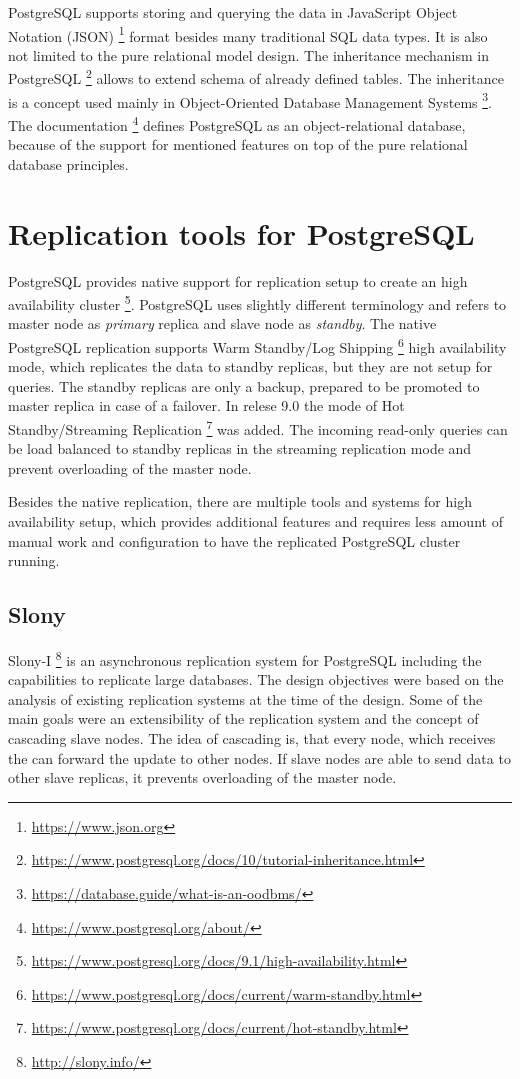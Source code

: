 \documentclass[
  digital, %
  twoside, %
  table,   %
  lof,     %
  lot,     %
]{fithesis3}
\begin{document}
PostgreSQL supports storing and querying the data in JavaScript Object Notation (JSON) \footnote{\url{https://www.json.org}} format besides many traditional SQL data types. It is also not limited to the pure relational model design. The inheritance mechanism in PostgreSQL \footnote{\url{https://www.postgresql.org/docs/10/tutorial-inheritance.html}} allows to extend schema of already defined tables. The inheritance is a concept used mainly in Object-Oriented Database Management Systems \footnote{\url{https://database.guide/what-is-an-oodbms/}}. The documentation \footnote{\url{https://www.postgresql.org/about/}} defines PostgreSQL as an object-relational database, because of the support for mentioned features on top of the pure relational database principles.

\section{Replication tools for PostgreSQL}
PostgreSQL provides native support for replication setup to create an high availability cluster \footnote{\url{https://www.postgresql.org/docs/9.1/high-availability.html}}. PostgreSQL uses slightly different terminology and refers to master node as \textit{primary} replica and slave node as \textit{standby}. The native PostgreSQL replication supports Warm Standby/Log Shipping \footnote{\url{https://www.postgresql.org/docs/current/warm-standby.html}} high availability mode, which replicates the data to standby replicas, but they are not setup for queries. The standby replicas are only a backup, prepared to be promoted to master replica in case of a failover. In relese 9.0 the mode of Hot Standby/Streaming Replication \footnote{\url{https://www.postgresql.org/docs/current/hot-standby.html}} was added. The incoming read-only queries can be load balanced to standby replicas in the streaming replication mode and prevent overloading of the master node.

Besides the native replication, there are multiple tools and systems for high availability setup, which provides additional features and requires less amount of manual work and configuration to have the replicated PostgreSQL cluster running.

\subsection{Slony}
Slony-I \footnote{\url{http://slony.info/}} is an asynchronous replication system for PostgreSQL including the capabilities to replicate large databases. The design objectives were based on the analysis of existing replication systems at the time of the design. Some of the main goals were an extensibility of the replication system and the concept of cascading slave nodes. The idea of cascading is, that every node, which receives the can forward the update  to other nodes. If slave nodes are able to send data to other slave replicas, it prevents overloading of the master node.
\end{document}
